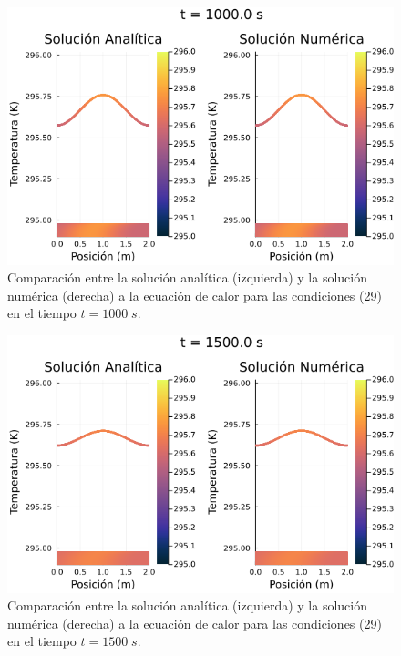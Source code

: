 \documentclass[12pt]{article}
\begin{document}
\begin{figure}[H]
\begin{center}
    \includegraphics[width=0.79\linewidth]{Ejemplo_02_t_3.png}
    \caption{Comparación entre la solución analítica (izquierda) y la solución numérica (derecha) a la ecuación de calor para las condiciones (29) en el tiempo $t=1000 \; s$.}
\end{center}
\end{figure}

\begin{figure}[H]
\begin{center}
    \includegraphics[width=0.79\linewidth]{Ejemplo_02_t_4.png}
    \caption{Comparación entre la solución analítica (izquierda) y la solución numérica (derecha) a la ecuación de calor para las condiciones (29) en el tiempo $t=1500 \; s$.}
\end{center}
\end{figure}
\end{document}
